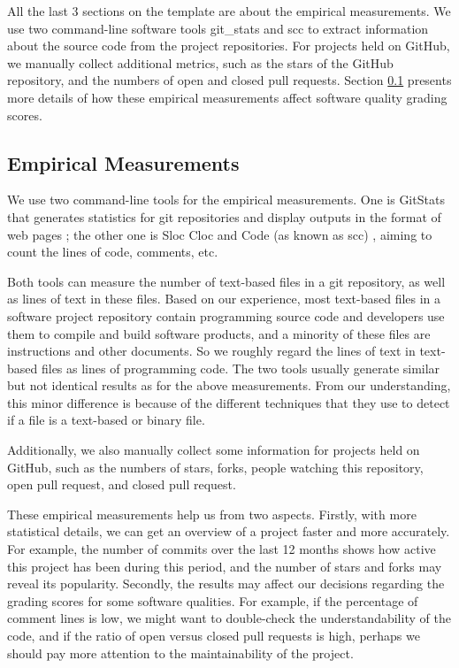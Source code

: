 All the last 3 sections on the template are about the empirical measurements. We use two command-line software tools git\_stats and scc to extract information about the source code from the project repositories. For projects held on GitHub, we manually collect additional metrics, such as the stars of the GitHub repository, and the numbers of open and closed pull requests. Section \ref{sec_empirical_measurements} presents more details of how these empirical measurements affect software quality grading scores.

\subsection{Empirical Measurements}
\label{sec_empirical_measurements}

We use two command-line tools for the empirical measurements. One is GitStats that generates statistics for git repositories and display outputs in the format of web pages \cite{Gieniusz2019}; the other one is Sloc Cloc and Code (as known as scc) \cite{Boyter2021}, aiming to count the lines of code, comments, etc.

Both tools can measure the number of text-based files in a git repository, as well as lines of text in these files. Based on our experience, most text-based files in a software project repository contain programming source code and developers use them to compile and build software products, and a minority of these files are instructions and other documents. So we roughly regard the lines of text in text-based files as lines of programming code. The two tools usually generate similar but not identical results as for the above measurements. From our understanding, this minor difference is because of the different techniques that they use to detect if a file is a text-based or binary file.

Additionally, we also manually collect some information for projects held on GitHub, such as the numbers of stars, forks, people watching this repository, open pull request, and closed pull request.

These empirical measurements help us from two aspects. Firstly, with more statistical details, we can get an overview of a project faster and more accurately. For example, the number of commits over the last 12 months shows how active this project has been during this period, and the number of stars and forks may reveal its popularity. Secondly, the results may affect our decisions regarding the grading scores for some software qualities. For example, if the percentage of comment lines is low, we might want to double-check the understandability of the code, and if the ratio of open versus closed pull requests is high, perhaps we should pay more attention to the maintainability of the project.

